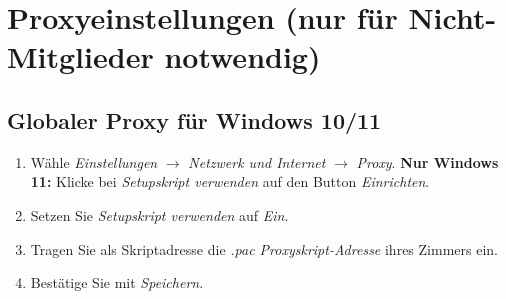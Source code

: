 \documentclass[a4paper,12pt]{scrartcl}
\begin{document}
\section{Proxyeinstellungen (nur für Nicht-Mitglieder notwendig)}
\label{proxy}

\subsection{Globaler Proxy für Windows 10/11}
\begin{enumerate}
	\item Wähle \textit{Einstellungen} $\rightarrow$ \textit{Netzwerk und Internet} $\rightarrow$ \textit{Proxy}.
	\subitem \textbf{Nur Windows 11:} Klicke bei \textit{Setupskript verwenden} auf den Button  \textit{Einrichten}.
	
	\setcounter{enumi}{1}
	\item Setzen Sie \textit{Setupskript verwenden} auf \textit{Ein}.
	\item Tragen Sie als Skriptadresse die \textit{.pac Proxyskript-Adresse} ihres Zimmers ein.
	\item Bestätige Sie mit \textit{Speichern}.
\end{enumerate}
\end{document}
